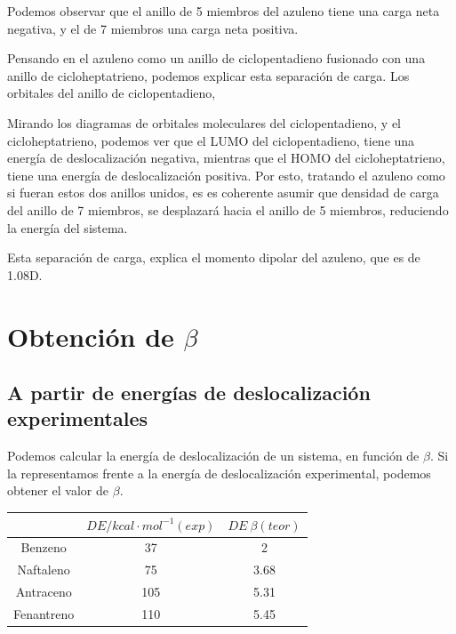 \documentclass[12pt]{article}
\begin{document}
Podemos observar que el anillo de 5 miembros del azuleno tiene una carga neta negativa, y el de 7 miembros una carga neta positiva.

Pensando en el azuleno como un anillo de ciclopentadieno fusionado con una anillo de cicloheptatrieno, podemos explicar esta separación de carga. Los orbitales del anillo de ciclopentadieno, 

Mirando los diagramas de orbitales moleculares del ciclopentadieno, y el cicloheptatrieno, podemos ver que el LUMO del ciclopentadieno, tiene una energía de deslocalización negativa, mientras que el HOMO del cicloheptatrieno, tiene una energía de deslocalización positiva. Por esto, tratando el azuleno como si fueran estos dos anillos unidos, es es coherente asumir que densidad de carga del anillo de 7 miembros, se desplazará hacia el anillo de 5 miembros, reduciendo la energía del sistema.

Esta separación de carga, explica el momento dipolar del azuleno, que es de 1.08D.





\section{Obtención de $\beta$}
\subsection{A partir de energías de deslocalización experimentales}
Podemos calcular la energía de deslocalización de un sistema, en función de $\beta$. Si la representamos frente a la energía de deslocalización experimental, podemos obtener el valor de $\beta$.

\begin{center}
    \begin{tabular}{|c|c|c|}
\hline
& $DE/kcal \cdot mol^{-1} (exp)$ & $DE\ \beta (teor)$ \\
\hline
Benzeno     & 37  & 2     \\
Naftaleno   & 75  & 3.68  \\
Antraceno   & 105 & 5.31  \\
Fenantreno  & 110 & 5.45  \\
\hline
\end{tabular}

\end{center}
\end{document}
